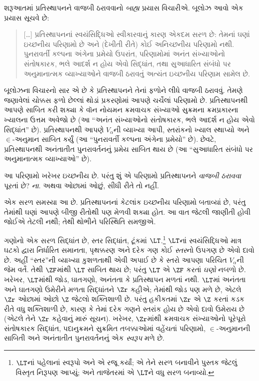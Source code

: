 શરૂઆતમાં પ્રતિસ્થાપનને વાજબી ઠરાવવાનો \emph{બાહ્ય} પ્રયાસ
વિચારીએ. બૂલોઝ આવો એક પ્રયાસ સૂચવે છે:
\begin{quote}
  [\ldots] પ્રતિસ્થાપનનાં સ્વયંસિદ્ધિઓ સ્વીકારવાનું કારણ એકદમ
  સરળ છે: તેમનાં ઘણાં ઇચ્છનીય પરિણામો છે અને (દેખીતી રીતે)
  કોઈ અનિચ્છનીય પરિણામો નથી. પુનરાવર્તી કલ્પના અંગેના
  પ્રમેયો ઉપરાંત, પરિણામોમાં અનંત સંખ્યાઓનો સંતોષકારક,
  ભલે આદર્શ ન હોય એવો સિદ્ધાંત, તથા સુઆધારિત સંબંધો પર
  અનુમાનાત્મક વ્યાખ્યાઓને વાજબી ઠરાવતું અત્યંત ઇચ્છનીય
  પરિણામ સામેલ છે.
  \citep[229]{Boolos1971}
\end{quote}
બૂલોઝના વિચારનો સાર એ છે કે પ્રતિસ્થાપનને તેનાં ફળોને લીધે
વાજબી ઠરાવવું. તેમણે જણાવેલાં ચોક્કસ ફળો છેલ્લાં થોડાં
પ્રકરણોમાં આપણે ચર્ચેલાં પરિણામો છે. પ્રતિસ્થાપનથી આપણે
સાબિત કરી શક્યા કે વૉન નોયમન ક્રમવાચક સંખ્યાઓ સુક્રમના
ક્રમપ્રકારના ખ્યાલના ઉત્તમ અવેજો છે (આ ``અનંત સંખ્યાઓનો
સંતોષકારક, ભલે આદર્શ ન હોય એવો સિદ્ધાંત'' છે).
પ્રતિસ્થાપનથી આપણે $V_\alpha$ની વ્યાખ્યા આપી, સ્તરાંકનો
ખ્યાલ સ્થાપ્યો અને $\in$-અનુમાન સાબિત કર્યું (આ
``પુનરાવર્તી કલ્પના અંગેના પ્રમેયો'' છે). છેવટે,
પ્રતિસ્થાપનથી અનંતાતીત પુનરાવર્તનનું પ્રમેય સાબિત થાય છે
(આ ``સુઆધારિત સંબંધો પર અનુમાનાત્મક વ્યાખ્યાઓ'' છે).

આ પરિણામો ખરેખર ઇચ્છનીય છે. પરંતુ શું એ પરિણામો
પ્રતિસ્થાપનને \emph{વાજબી ઠરાવવા} પૂરતાં છે? \emph{ના}.
અથવા ઓછામાં ઓછું, સીધી રીતે તો નહીં.

એક સરળ સમસ્યા આ છે. પ્રતિસ્થાપનનાં કેટલાંક ઇચ્છનીય
પરિણામો બતાવ્યાં છે, પરંતુ તેમાંથી ઘણાં આપણે બીજી રીતોથી
પણ મેળવી શક્યા હોત. આ વાત જેટલી જાણીતી હોવી જોઈએ
તેટલી નથી; તેથી થોભીને પરિસ્થિતિ સમજીએ.

ગણોનો એક સરળ સિદ્ધાંત છે, સ્તર સિદ્ધાંત, ટૂંકમાં
$\LT$.\footnote{$\LT$નાં પહેલાનાં સ્વરૂપો \citet{Montague1965}
અને \citet{Scott1974}એ રજૂ કર્યાં; \citet{Potter2004}એ તેને
સરળ બનાવીને પુસ્તક જેટલું વિસ્તૃત નિરૂપણ આપ્યું; અને
તાજેતરમાં \citet{ButtonLT1}એ $\LT$ને વધુ સરળ બનાવ્યો.}
$\LT$નાં સ્વયંસિદ્ધિઓ માત્ર ઘટકો દ્વારા નિર્ધારિત સમાનતા,
પૃથક્કરણ અને
દરેક ગણ કોઈ \emph{સ્તર}નો ઉપગણ છે એવો દાવો છે. અહીં
``સ્તર''ની વ્યાખ્યા કુશળતાથી એવી અપાઈ છે કે સ્તરો
આપણા પરિચિત $V_\alpha$ની જેમ વર્તે. તેથી $\ZF$માંથી
$\LT$ સાબિત થાય છે; પરંતુ $\LT$ એ $\ZF$ કરતાં
\emph{ઘણો} નબળો છે. ખરેખર, $\LT$માંથી જોડ, ઘાતગણો,
અનંતતા કે પ્રતિસ્થાપન મળતાં નથી. $\LT$માં અનંતતા અને
ઘાતગણો ઉમેરીને મળતા સિદ્ધાંતને $\Zr$ કહીએ; તેમાંથી
જોડ પણ મળે છે, એટલે $\Zr$ ઓછામાં ઓછો $\Z$ જેટલો
શક્તિશાળી છે. પરંતુ હકીકતમાં $\Zr$ એ $\Z$ કરતાં
કડક રીતે વધુ શક્તિશાળી છે, કારણ કે તેમાં દરેક ગણને સ્તરાંક
હોય છે એવો દાવો ઉમેરાય છે (એટલે તેને $\Zr$ કહેવાનું
મારું સૂચન). ખરેખર, $\Zr$માંથી ક્રમવાચક સંખ્યાઓનો
પૂરેપૂરો સંતોષકારક સિદ્ધાંત, પદાનુક્રમને સુક્રમિત તબક્કાઓમાં
વહેંચતાં પરિણામો, $\in$-અનુમાનની સાબિતી અને અનંતાતીત
પુનરાવર્તનનું એક \emph{સ્વરૂપ} મળે છે.

